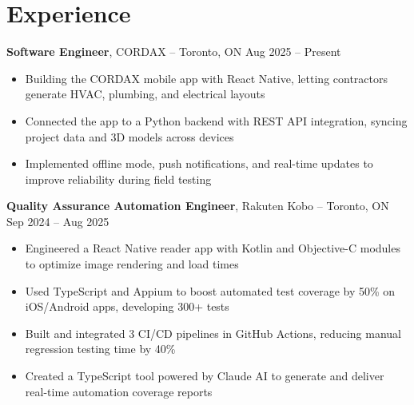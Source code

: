 

\section*{Experience}
\textbf{Software Engineer}, {CORDAX} -- Toronto, ON \hfill Aug 2025 -- Present \\
\vspace{-5pt}
\begin{itemize}
  \item Building the CORDAX mobile app with React Native, letting contractors generate HVAC, plumbing, and electrical layouts
  \item Connected the app to a Python backend with REST API integration, syncing project data and 3D models across devices
  \item Implemented offline mode, push notifications, and real-time updates to improve reliability during field testing
\end{itemize}


\textbf{Quality Assurance Automation Engineer}, {Rakuten Kobo} -- Toronto, ON \hfill Sep 2024 -- Aug 2025 \\
\vspace{-5pt}
\begin{itemize}
  \item Engineered a React Native reader app with Kotlin and Objective-C modules to optimize image rendering and load times
  \item Used TypeScript and Appium to boost automated test coverage by 50\% on iOS/Android apps, developing 300+ tests
  \item Built and integrated 3 CI/CD pipelines in GitHub Actions, reducing manual regression testing time by 40\%
  \item Created a TypeScript tool powered by Claude AI to generate and deliver real-time automation coverage reports
\end{itemize}

